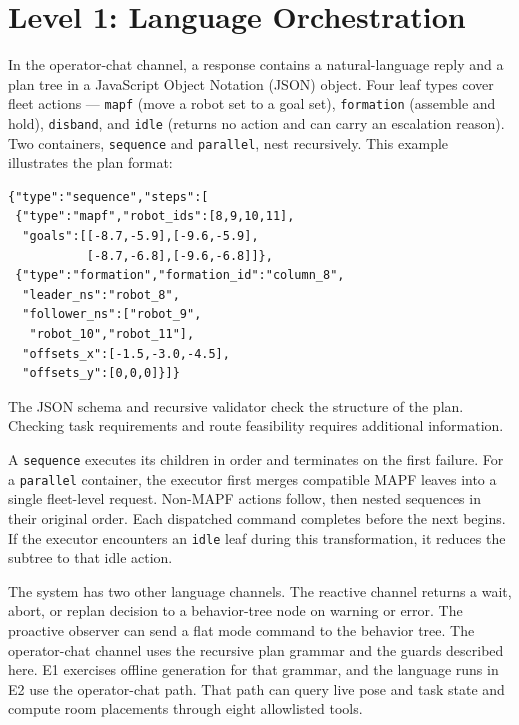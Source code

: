\documentclass[pdflatex,sn-mathphys-num]{sn-jnl}
\newcommand{\code}[1]{{\def\{{\textnormal{\textbraceleft}}\def\}{\textnormal{\textbraceright}}\texttt{#1}}}
\begin{document}
\section{Level 1: Language Orchestration}
\label{sec:orch}

In the operator-chat channel, a response contains a natural-language reply
and a plan tree in a JavaScript Object Notation (JSON) object. Four leaf types cover fleet actions --- \code{mapf} (move a robot set to
a goal set), \code{formation} (assemble and hold), \code{disband}, and
\code{idle} (returns no action and can carry an escalation reason). Two
containers, \code{sequence} and \code{parallel}, nest recursively. This
example illustrates the plan format:

\begin{center}\small
\begin{minipage}{\columnwidth}
\begin{verbatim}
{"type":"sequence","steps":[
 {"type":"mapf","robot_ids":[8,9,10,11],
  "goals":[[-8.7,-5.9],[-9.6,-5.9],
           [-8.7,-6.8],[-9.6,-6.8]]},
 {"type":"formation","formation_id":"column_8",
  "leader_ns":"robot_8",
  "follower_ns":["robot_9",
   "robot_10","robot_11"],
  "offsets_x":[-1.5,-3.0,-4.5],
  "offsets_y":[0,0,0]}]}
\end{verbatim}
\end{minipage}
\end{center}

The JSON schema and recursive validator check the structure of the plan.
Checking task requirements and route feasibility requires additional information.

A \code{sequence} executes its children in order and terminates on the first
failure. For a \code{parallel} container, the executor first merges compatible
MAPF leaves into a single fleet-level request. Non-MAPF actions follow, then
nested sequences in their original order. Each dispatched command completes
before the next begins. If the executor encounters an \code{idle} leaf during
this transformation, it reduces the subtree to that idle action.

The system has two other language channels. The reactive channel returns a
wait, abort, or replan decision to a behavior-tree node on warning or error.
The proactive observer can send a
flat mode command to the behavior tree. The operator-chat channel uses the
recursive plan grammar and the guards described here. E1 exercises offline
generation for that grammar, and the language runs in E2 use the
operator-chat path. That path can query live pose and task state and compute
room placements through eight allowlisted tools.
\end{document}
